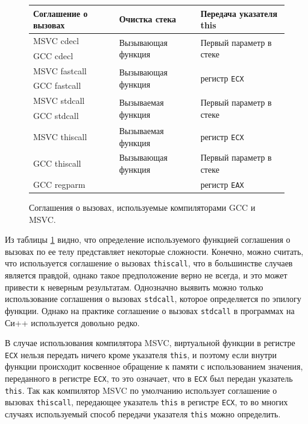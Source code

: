 \begin{figure}[htb!]
\begin{tabular}{| l | l | l |}
\hline
Соглашение о вызовах & Очистка стека & Передача указателя {\color{keywordcolor}\textbf{this}} \\
\hline
MSVC cdecl & \multirow{2}{*}{Вызывающая функция} & \multirow{2}{*}{Первый параметр в стеке} \\
GCC cdecl & & \\
\hline
MSVC fastcall & \multirow{2}{*}{Вызывающая функция} & \multirow{2}{*}{регистр {\tt ECX}} \\
GCC fastcall & & \\
\hline
MSVC stdcall & \multirow{2}{*}{Вызываемая функция} & \multirow{2}{*}{Первый параметр в стеке} \\
GCC stdcall & & \\
\hline
MSVC thiscall & Вызываемая функция & регистр {\tt ECX} \\
\hline
GCC thiscall & Вызывающая функция & Первый параметр в стеке \\
\hline
GCC regparm & & регистр {\tt EAX} \\
\hline
\end{tabular}
\caption{Соглашения о вызовах, используемые компиляторами GCC и MSVC.}
\label{fig:calling_conv}
\end{figure}

Из таблицы \ref{fig:calling_conv} видно, что определение используемого функцией соглашения о вызовах по ее телу представляет некоторые сложности. Конечно, можно считать, что используется соглашение о вызовах \lstinline{thiscall}, что в большинстве случаев является правдой, однако такое предположение верно не всегда, и это может привести к неверным результатам. Однозначно выявить можно только использование соглашения о вызовах \lstinline{stdcall}, которое определяется по эпилогу функции. Однако на практике соглашение о вызовах \lstinline{stdcall} в программах на Си++ используется довольно редко.

В случае использования компилятора MSVC, виртуальной функции в регистре {\tt ECX} нельзя передать ничего кроме указателя \lstinline{this}, и поэтому если внутри функции происходит косвенное обращение к памяти с использованием значения, переданного в регистре {\tt ECX}, то это означает, что в {\tt ECX} был передан указатель \lstinline{this}. Так как компилятор MSVC по умолчанию использует соглашение о вызовах \lstinline{thiscall}, передающее указатель \lstinline{this} в регистре {\tt ECX}, то во многих случаях используемый способ передачи указателя \lstinline{this} можно определить.

